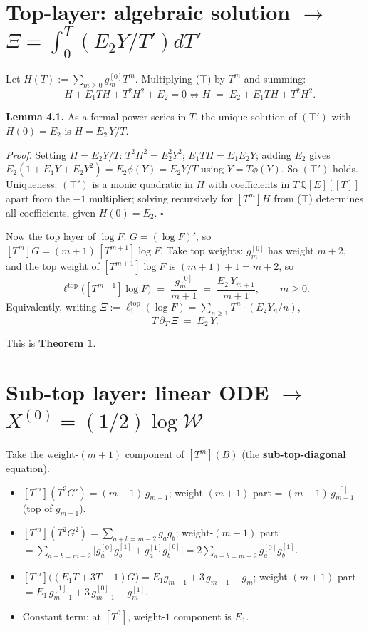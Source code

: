 \documentclass[11pt]{article}
\newcommand{\W}{\mathcal{W}}
\begin{document}
\section{Top-layer: algebraic solution $\to$ $\Xi = \int_0^T (E_2 Y / T') dT'$}

Let $H(T) := \sum_{m \ge 0} g_m^{[0]} T^m$. Multiplying ($\top$) by $T^m$ and summing:
\begin{equation}\tag{$\top'$}
-\,H + E_1 T H + T^2 H^2 + E_2 = 0 \iff H \;=\; E_2 + E_1 T H + T^2 H^2.
\end{equation}

\noindent\textbf{Lemma 4.1.} As a formal power series in $T$, the unique solution of $(\top')$ with $H(0) = E_2$ is $H = E_2\,Y/T$.

\emph{Proof.} Setting $H = E_2 Y/T$: $T^2 H^2 = E_2^2 Y^2$; $E_1 T H = E_1 E_2 Y$; adding $E_2$ gives $E_2 (1 + E_1 Y + E_2 Y^2) = E_2 \phi(Y) = E_2 Y/T$ using $Y = T\phi(Y)$. So $(\top')$ holds. Uniqueness: $(\top')$ is a monic quadratic in $H$ with coefficients in $T\,\mathbb Q[E][[T]]$ apart from the $-1$ multiplier; solving recursively for $[T^m]H$ from ($\top$) determines all coefficients, given $H(0) = E_2$. $\square$

Now the top layer of $\log F$: $G = (\log F)'$, so $[T^{m}] G = (m+1)\,[T^{m+1}]\log F$. Take top weights: $g_m^{[0]}$ has weight $m+2$, and the top weight of $[T^{m+1}]\log F$ is $(m+1)+1 = m+2$, so
$$\ell^{\mathrm{top}}\big([T^{m+1}]\log F\big) \;=\; \frac{g_m^{[0]}}{m+1} \;=\; \frac{E_2\,Y_{m+1}}{m+1}, \qquad m \ge 0.$$
Equivalently, writing $\Xi := \ell^{\mathrm{top}}_1(\log F) = \sum_{n \ge 1} T^n \cdot (E_2 Y_n/n)$,
$$T\,\partial_T\,\Xi \;=\; E_2\,Y.$$

This is \textbf{Theorem 1}.

\section{Sub-top layer: linear ODE $\to$ $X^{(0)} = (1/2)\log \W$}

Take the weight-$(m+1)$ component of $[T^m](B)$ (the \textbf{sub-top-diagonal} equation).

\begin{itemize}
  \item $[T^m](T^2 G') = (m-1)\,g_{m-1}$; weight-$(m+1)$ part = $(m-1)\,g_{m-1}^{[0]}$ (top of $g_{m-1}$).
  \item $[T^m](T^2 G^2) = \sum_{a+b=m-2} g_a g_b$; weight-$(m+1)$ part $= \sum_{a+b=m-2}\big[g_a^{[0]} g_b^{[1]} + g_a^{[1]} g_b^{[0]}\big] = 2\sum_{a+b=m-2} g_a^{[0]} g_b^{[1]}$.
  \item $[T^m]\big((E_1 T + 3T - 1) G\big) = E_1 g_{m-1} + 3\,g_{m-1} - g_m$; weight-$(m+1)$ part $= E_1\,g_{m-1}^{[1]} + 3\,g_{m-1}^{[0]} - g_m^{[1]}$.
  \item Constant term: at $[T^0]$, weight-$1$ component is $E_1$.
\end{itemize}
\end{document}
